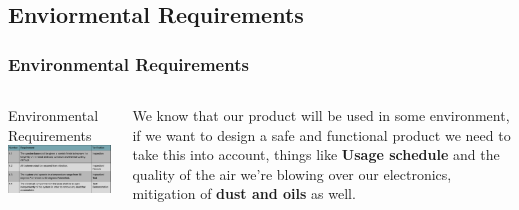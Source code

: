 \documentclass[aspectratio=169]{beamer}
\begin{document}
\subsection{Enviormental Requirements}
\begin{frame}
    \frametitle{Environmental Requirements}

    \begin{columns}
        \begin{column}{0.48\textwidth}
            \begin{block}{Environmental Requirements}
                \includegraphics[width=7.3cm]{EnviromentalAndSafety}
            \end{block}
        \end{column}

        \begin{column}{0.48\textwidth}
            We know that our product will be used in some environment, if we want to design a safe
            and functional product we need to take this into account, things like \textbf{Usage schedule}
            and the quality of the air we're blowing over our electronics, mitigation of
            \textbf{dust and oils} as well.
        \end{column}
    \end{columns}


\end{frame}
\end{document}
